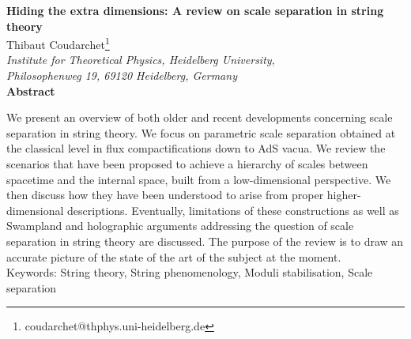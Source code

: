 \documentclass[11pt, a4paper]{article}
\renewcommand{\baselinestretch}{1.5}
\begin{document}
\thispagestyle{empty}

\rightline{}

\begin{center}
\huge{{\bf Hiding the extra dimensions: A review on scale separation in string theory} 
\\[10mm]}
\large{Thibaut Coudarchet\footnote{coudarchet@thphys.uni-heidelberg.de}} \\[12mm]
\small{\it
Institute for Theoretical Physics, Heidelberg University,\\ Philosophenweg 19, 69120 Heidelberg, Germany 
\\[10mm]} 
\small{\bf Abstract} \\[5mm]
\end{center}
\begin{center}
\begin{minipage}[h]{15.0cm} 

We present an overview of both older and recent developments concerning scale separation in string theory. We focus on parametric scale separation obtained at the classical level in flux compactifications down to AdS vacua. We review the scenarios that have been proposed to achieve a hierarchy of scales between spacetime and the internal space, built from a low-dimensional perspective. We then discuss how they have been understood to arise from proper higher-dimensional descriptions. Eventually, limitations of these constructions as well as Swampland and holographic arguments addressing the question of scale separation in string theory are discussed. The purpose of the review is to draw an accurate picture of the state of the art of the subject at the moment.\\

Keywords: String theory, String phenomenology, Moduli stabilisation, Scale separation

\end{minipage}
\end{center}
\newpage

\setcounter{page}{1}
\pagestyle{plain}
\renewcommand{\thefootnote}{\arabic{footnote}}
\setcounter{footnote}{0}

\renewcommand{\baselinestretch}{1.5}
\end{document}
